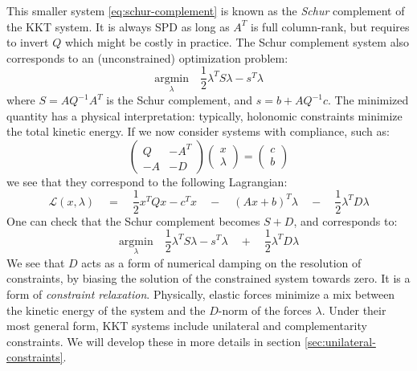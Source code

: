 \documentclass{article}
\newcommand{\LL}{\mathcal{L}}
\newcommand{\half}{\frac{1}{2}}
\newcommand{\block}[1]{\left(#1\right)}
\newcommand{\mat}[1]{ \begin{pmatrix} #1 \end{pmatrix} }
\newcommand{\inv}[1]{#1^{-1}}
\newcommand{\argmin}[1]{\underset{#1}{\textrm{argmin}}}
\begin{document}
%
This smaller system \eqref{eq:schur-complement} is known as the
\emph{Schur} complement of the KKT system. It is always SPD as long as
$A^T$ is full column-rank, but requires to invert $Q$ which might be
costly in practice. The Schur complement system also corresponds to an
(unconstrained) optimization problem:
%
\begin{equation}
  \argmin{\lambda}\quad \half \lambda^T S \lambda - s^T \lambda
\end{equation}
%
where $S = A \inv {Q} A^T$ is the Schur complement, and $s = b +
A\inv{Q}c$. The minimized quantity has a physical interpretation:
typically, holonomic constraints minimize the total kinetic energy. If
we now consider systems with compliance, such as:
%
\begin{equation}
  \label{eq:compliant-kkt-system}
  \mat{Q & -A^T \\-A & -D} \mat{x\\\lambda} = \mat{c\\b}
\end{equation}
%
we see that they correspond to the following Lagrangian:
%
\begin{equation}
  \LL(x, \lambda) \quad = \quad \half x^T Q x - c^T x \quad - 
  \quad \block{A x + b}^T \lambda \quad - \quad \half \lambda^T D \lambda
\end{equation}
%
One can check that the Schur complement becomes $S + D$, and
corresponds to:
%
\begin{equation}
  \argmin{\lambda}\quad \half \lambda^T S \lambda - s^T \lambda \quad + 
  \quad \half \lambda^T D \lambda
\end{equation}
%
We see that $D$ acts as a form of numerical damping on the resolution
of constraints, by biasing the solution of the constrained system
towards zero. It is a form of \emph{constraint
  relaxation}. Physically, elastic forces minimize a mix between the
kinetic energy of the system and the $D$-norm of the forces
$\lambda$. Under their most general form, KKT systems include
unilateral and complementarity constraints. We will develop these in
more details in section \ref{sec:unilateral-constraints}.
%
\end{document}
